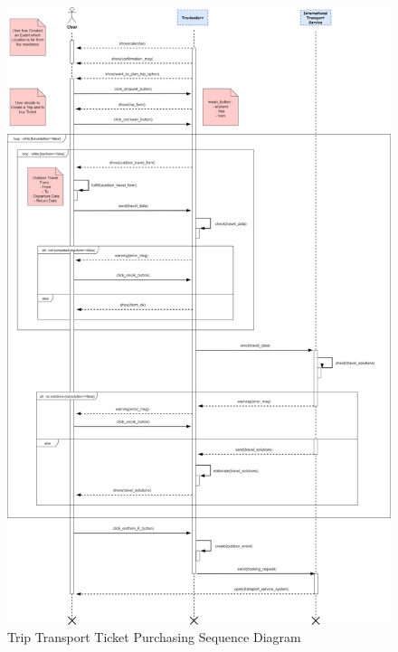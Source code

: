 \begin{figure}[H]
	\centering
	\includegraphics[scale=0.23]{Images/Sequence/Trip_Transport_Ticket_Purchasing}
	\caption{Trip Transport Ticket Purchasing Sequence Diagram}
\end{figure}

